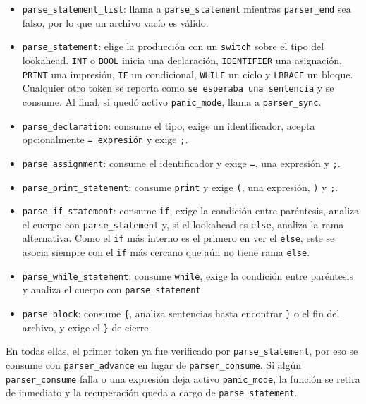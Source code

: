 \documentclass[12pt,letterpaper]{article}
\begin{document}
\begin{itemize}
\item \texttt{parse\_statement\_list}: llama a \texttt{parse\_statement} mientras \texttt{parser\_end} sea
  falso, por lo que un archivo vacío es válido.
  
\item \texttt{parse\_statement}: elige la producción con un \texttt{switch} sobre el tipo del lookahead.
  \texttt{INT} o \texttt{BOOL} inicia una declaración, \texttt{IDENTIFIER} una asignación, \texttt{PRINT}
  una impresión, \texttt{IF} un condicional, \texttt{WHILE} un ciclo y \texttt{LBRACE} un bloque. Cualquier
  otro token se reporta como \texttt{se esperaba una sentencia} y se consume. Al final, si quedó activo
  \texttt{panic\_mode}, llama a \texttt{parser\_sync}.
  
\item \texttt{parse\_declaration}: consume el tipo, exige un identificador, acepta opcionalmente
  \texttt{= expresión} y exige \texttt{;}.
  
\item \texttt{parse\_assignment}: consume el identificador y exige \texttt{=}, una expresión y \texttt{;}.
  
\item \texttt{parse\_print\_statement}: consume \texttt{print} y exige \texttt{(}, una expresión, \texttt{)}
  y \texttt{;}.
  
\item \texttt{parse\_if\_statement}: consume \texttt{if}, exige la condición entre paréntesis, analiza el
  cuerpo con \texttt{parse\_statement} y, si el lookahead es \texttt{else}, analiza la rama alternativa. Como
  el \texttt{if} más interno es el primero en ver el \texttt{else}, este se asocia siempre con el \texttt{if}
  más cercano que aún no tiene rama \texttt{else}.
  
\item \texttt{parse\_while\_statement}: consume \texttt{while}, exige la condición entre paréntesis y analiza
  el cuerpo con \texttt{parse\_statement}.
  
\item \texttt{parse\_block}: consume \texttt{\{}, analiza sentencias hasta encontrar \texttt{\}} o el fin del
  archivo, y exige el \texttt{\}} de cierre.
\end{itemize}

En todas ellas, el primer token ya fue verificado por \texttt{parse\_statement}, por eso se consume con
\texttt{parser\_advance} en lugar de \texttt{parser\_consume}. Si algún \texttt{parser\_consume} falla o una
expresión deja activo \texttt{panic\_mode}, la función se retira de inmediato y la recuperación queda a cargo
de \texttt{parse\_statement}.
\end{document}
